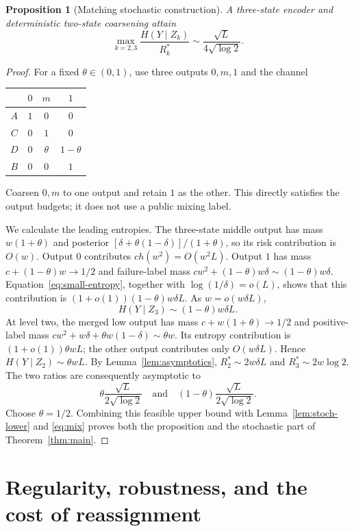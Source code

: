 \documentclass[11pt]{article}
\newtheorem{proposition}[theorem]{Proposition}
\theoremstyle{remark}\newtheorem{remark}[theorem]{Remark}
\begin{document}
\begin{proposition}[Matching stochastic construction]
\label{prop:stoch-upper}
A three-state encoder and deterministic two-state coarsening attain
\[
 \max_{k=2,3}\frac{H(Y\mid Z_k)}{R_k^*}
 \sim\frac{\sqrt L}{4\sqrt{\log2}}.
\]
\end{proposition}
\begin{proof}
For a fixed $\theta\in(0,1)$, use three outputs $0,m,1$ and the channel
\begin{center}
\begin{tabular}{c|ccc}
 & $0$ & $m$ & $1$\\\hline
$A$ & $1$ & $0$ & $0$\\
$C$ & $0$ & $1$ & $0$\\
$D$ & $0$ & $\theta$ & $1-\theta$\\
$B$ & $0$ & $0$ & $1$
\end{tabular}
\end{center}
Coarsen $0,m$ to one output and retain $1$ as the other. This directly
satisfies the output budgets; it does not use a public mixing label.

We calculate the leading entropies. The three-state middle output has mass
$w(1+\theta)$ and posterior
$[\delta+\theta(1-\delta)]/(1+\theta)$, so its risk contribution is
$O(w)$. Output $0$ contributes $c h(w^2)=O(w^2L)$. Output $1$ has mass
$c+(1-\theta)w\to1/2$ and failure-label mass
$c w^2+(1-\theta)w\delta\sim(1-\theta)w\delta$.
Equation~\eqref{eq:small-entropy}, together with
$\log(1/\delta)=o(L)$, shows that this contribution is
$(1+o(1))(1-\theta)w\delta L$. As $w=o(w\delta L)$,
\[
 H(Y\mid Z_3)\sim(1-\theta)w\delta L.
\]
At level two, the merged low output has mass
$c+w(1+\theta)\to1/2$ and positive-label mass
$c w^2+w\delta+\theta w(1-\delta)\sim\theta w$.
Its entropy contribution is $(1+o(1))\theta wL$; the other output
contributes only $O(w\delta L)$. Hence
$H(Y\mid Z_2)\sim\theta wL$.
By Lemma~\ref{lem:asymptotics}, $R_2^*\sim2w\delta L$ and
$R_3^*\sim2w\log2$. The two ratios are consequently asymptotic to
\[
 \theta\frac{\sqrt L}{2\sqrt{\log2}}
 \quad\text{and}\quad
 (1-\theta)\frac{\sqrt L}{2\sqrt{\log2}}.
\]
Choose $\theta=1/2$. Combining this feasible upper bound with
Lemma~\ref{lem:stoch-lower} and \eqref{eq:mix} proves both the proposition
and the stochastic part of Theorem~\ref{thm:main}.
\end{proof}

\section{Regularity, robustness, and the cost of reassignment}
\end{document}
